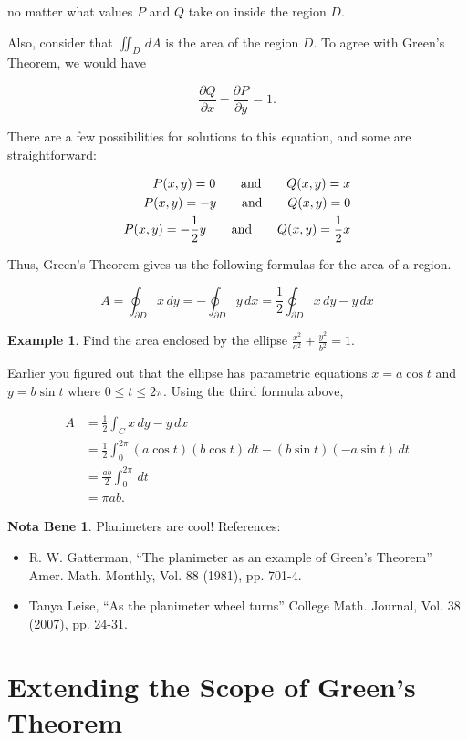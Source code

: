 \documentclass[11pt,oneside,english]{amsart}
\theoremstyle{definition}
\newtheorem*{example}{Example}
\newtheorem*{note}{Nota Bene}
\newcommand{\aspace}{\hspace{7mm}\text{and}\hspace{7mm}}
\newcommand{\pp}[2]{\frac{\partial{#1}}{\partial{#2}}}
\begin{document}
no matter what values $P$ and $Q$ take on inside the region $D$.

Also, consider that $\iint_D\,dA$ is the area of the region $D$. To agree with Green's Theorem, we would have

\[
\pp{Q}{x}-\pp{P}{y}=1.
\]

There are a few possibilities for solutions to this equation, and some are straightforward:

\begin{align*}
P(x,y)=0\aspace Q(x,y)=x\\
P(x,y)=-y\aspace Q(x,y)=0\\
P(x,y)=-\frac{1}{2}y\aspace Q(x,y)=\frac{1}{2}x
\end{align*}

Thus, Green's Theorem gives us the following formulas for the area of a region.

\[
A=\oint_{\partial D}x\,dy=-\oint_{\partial D}y\,dx=\frac{1}{2}\oint_{\partial D}x\,dy-y\,dx
\]

\begin{example}
Find the area enclosed by the ellipse $\frac{x^2}{a^2}+\frac{y^2}{b^2}=1$.

Earlier you figured out that the ellipse has parametric equations $x=a\cos t$ and $y=b\sin t$ where $0\leq t\leq 2\pi$. Using the third formula above,

\begin{align*}
A&=\frac{1}{2}\int_Cx\,dy-y\,dx\\[2mm]
&=\frac{1}{2}\int_0^{2\pi}(a\cos t)(b\cos t)\,dt-(b\sin t)(-a\sin t)\,dt\\[2mm]
&=\frac{ab}{2}\int_0^{2\pi}\,dt\\[2mm]
&=\pi ab.
\end{align*}
\end{example}

\begin{note}
Planimeters are cool! References:

\begin{itemize}
\itemsep3mm
\item R. W. Gatterman, ``The planimeter as an example of Green's Theorem'' Amer. Math. Monthly, Vol. 88 (1981), pp. 701-4.
\item Tanya Leise, ``As the planimeter wheel turns'' College Math. Journal, Vol. 38 (2007), pp. 24-31.
\end{itemize}
\end{note}

\section*{Extending the Scope of Green's Theorem}
\end{document}
